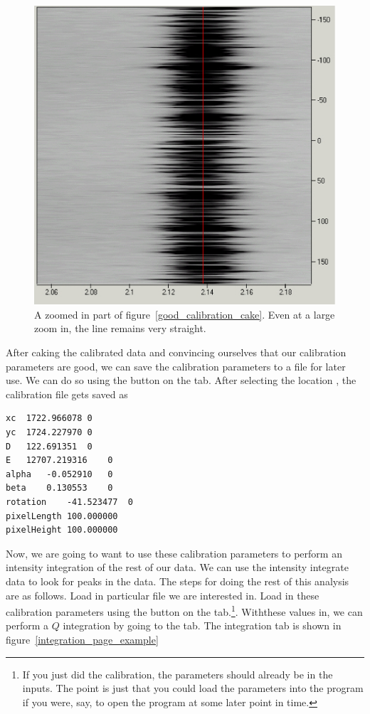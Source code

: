 \begin{figure}
    \centering
    \includegraphics[scale=.75]{figures/good_calibration_cake_zoom.eps}
    \caption{A zoomed in part of figure~\ref{good_calibration_cake}. 
    Even at a large zoom in, the line remains very straight.}
    \label{good_calibration_cake_zoom}
\end{figure}

After caking the calibrated data and convincing ourselves that
our calibration parameters are good, we can save the calibration
parameters to a file for later use. We can do so using the
 button on the  tab.
After selecting the location , the
calibration file gets saved as
\begin{lstlisting}[caption={'The Calibration Parameters File'}]
xc	1722.966078	0
yc	1724.227970	0
D	122.691351	0
E	12707.219316	0
alpha	-0.052910	0
beta	0.130553	0
rotation	-41.523477	0
pixelLength	100.000000
pixelHeight	100.000000
\end{lstlisting}
Now, we are going to want to use these calibration
parameters to perform an intensity integration of the
rest of our data. We can use the intensity
integrate data to look for peaks in the data.
The steps for doing the rest of
this analysis are as follows. Load in particular file we
are interested in. Load in these calibration parameters
using the  button on the 
tab.\footnote{If you just did the calibration, the 
parameters should already be in the inputs. The point is
just that you could load the parameters into the program
if you were, say, to open the program at some later point
in time.}. Withthese values in, we can perform a $Q$
integration by going to the  tab.
The integration tab is shown in 
figure~\ref{integration_page_example}

